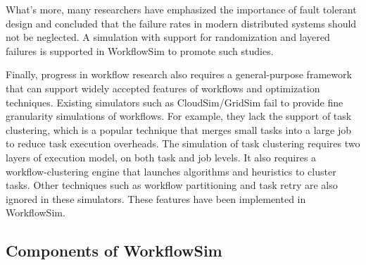 What’s more, many researchers \cite{Zhang2004, Tang1990, Schroeder2006, Sahoo2004, Oppenheimer2002, Mcconnel} have emphasized the importance of fault tolerant design and concluded that the failure rates in modern distributed systems should not be neglected. A simulation with support for randomization and layered failures is supported in WorkflowSim to promote such studies. 

Finally, progress in workflow research also requires a general-purpose framework that can support widely accepted features of workflows and optimization techniques. Existing simulators such as CloudSim/GridSim \cite{Calheiros2011} fail to provide fine granularity simulations of workflows. For example, they lack the support of task clustering, which is a popular technique that merges small tasks into a large job to reduce task execution overheads. The simulation of task clustering requires two layers of execution model, on both task and job levels. It also requires a workflow-clustering engine that launches algorithms and heuristics to cluster tasks. Other techniques such as workflow partitioning and task retry are also ignored in these simulators. These features have been implemented in WorkflowSim. 


\subsection{Components of WorkflowSim}

